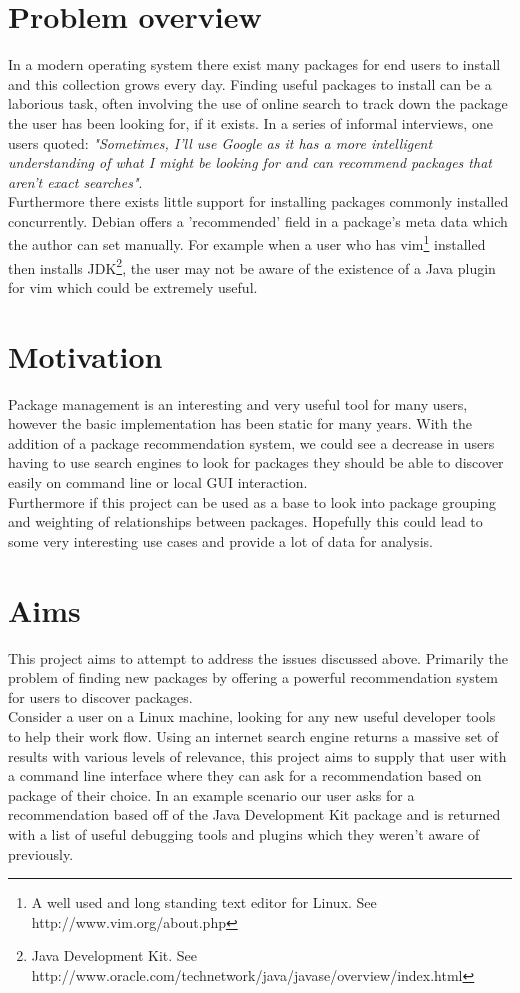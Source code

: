 \documentclass{l4proj}
\begin{document}
\section{Problem overview}
In a modern operating system there exist many packages for end users to install and this collection grows every day\cite{debpopcon}. Finding useful packages to install can be a laborious task, often involving the use of online search to track down the package the user has been looking for, if it exists. In a series of informal interviews, one users quoted: \emph{"Sometimes, I'll use Google as it has a more intelligent understanding of what I might be looking for and can recommend packages that aren't exact searches"}.\\
Furthermore there exists little support for installing packages commonly installed concurrently. Debian offers a 'recommended' field in a package's meta data which the author can set manually. For example when a user who has vim\footnote{A well used and long standing text editor for Linux. See http://www.vim.org/about.php} installed then installs JDK\footnote{Java Development Kit. See http://www.oracle.com/technetwork/java/javase/overview/index.html}, the user may not be aware of the existence of a Java plugin for vim which could be extremely useful.

\section{Motivation}
Package management is an interesting and very useful tool for many users, however the basic implementation has been static for many years. With the addition of a package recommendation system, we could see a decrease in users having to use search engines to look for packages they should be able to discover easily on command line or local GUI interaction.\\
Furthermore if this project can be used as a base to look into package grouping and weighting of relationships between packages. Hopefully this could lead to some very interesting use cases and provide a lot of data for analysis.
 
\section{Aims}
This project aims to attempt to address the issues discussed above. Primarily the problem of finding new packages by offering a powerful recommendation system for users to discover packages.\\
Consider a user on a Linux machine, looking for any new useful developer tools to help their work flow. Using an internet search engine returns a massive set of results with various levels of relevance, this project aims to supply that user with a command line interface where they can ask for a recommendation based on package of their choice. In an example scenario our user asks for a recommendation based off of the Java Development Kit package and is returned with a list of useful debugging tools and plugins which they weren't aware of previously.
\end{document}

